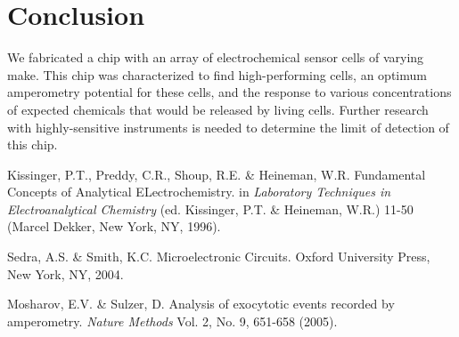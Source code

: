 \documentclass{article}
\begin{document}
\section{Conclusion}

We fabricated a chip with an array of electrochemical sensor cells of varying make. This chip was characterized to find high-performing cells, an optimum amperometry potential for these cells, and the response to various concentrations of expected chemicals that would be released by living cells. Further research with highly-sensitive instruments is needed to determine the limit of detection of this chip.

\begin{thebibliography}{9}

 Kissinger, P.T., Preddy, C.R., Shoup, R.E. \& Heineman, W.R. Fundamental Concepts of Analytical ELectrochemistry. in \emph{Laboratory Techniques in Electroanalytical Chemistry} (ed. Kissinger, P.T. \& Heineman, W.R.) 11-50 (Marcel Dekker, New York, NY, 1996).

 Sedra, A.S. \& Smith, K.C. Microelectronic Circuits. Oxford University Press, New York, NY, 2004.

 Mosharov, E.V. \& Sulzer, D. Analysis of exocytotic events recorded by amperometry. \emph{Nature Methods} Vol. 2, No. 9, 651-658 (2005).

\end{thebibliography}
\end{document}
